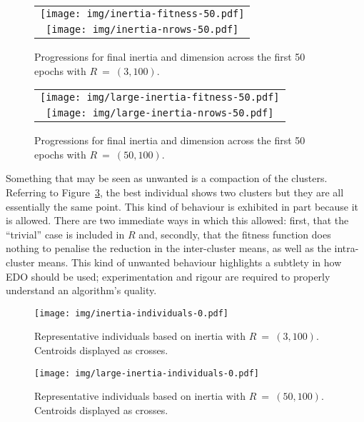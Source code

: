 \begin{figure}[htbp]
    \ContinuedFloat*
    \centering
    \begin{tabular}{c}
        \texttt{[image: img/inertia-fitness-50.pdf]}\\
        \texttt{[image: img/inertia-nrows-50.pdf]}
    \end{tabular}
    \caption{%
        \label{figure:inertia-50}
        Progressions for final inertia and dimension across the first 50
        epochs with \(R~=~(3,100)\).
    }
\end{figure}

\begin{figure}[htbp]
    \ContinuedFloat%
    \centering
    \begin{tabular}{c}
        \texttt{[image: img/large-inertia-fitness-50.pdf]}\\
        \texttt{[image: img/large-inertia-nrows-50.pdf]}
    \end{tabular}
    \caption{%
        \label{figure:large-inertia-50}
        Progressions for final inertia and dimension across the first 50 epochs
        with \(R~=~(50,100)\).
    }
\end{figure}

Something that may be seen as unwanted is a compaction of the clusters.
Referring to Figure~\ref{figure:inertia-individuals}, the best individual
shows
two clusters but they are all essentially the same point. This kind of behaviour
is exhibited in part because it is allowed. There are two immediate ways in
which this allowed: first, that the ``trivial'' case is included in \(R\) and,
secondly, that the fitness function does nothing to penalise the reduction in
the inter-cluster means, as well as the intra-cluster means. This kind of
unwanted behaviour highlights a subtlety in how EDO should be used;
experimentation and rigour are required to properly understand an algorithm's
quality.

\begin{figure}[htbp]
    \ContinuedFloat*
    \centering
    \texttt{[image: img/inertia-individuals-0.pdf]}
    \caption{%
        \label{figure:inertia-individuals}
        Representative individuals based on inertia with \(R~=~(3,100)\).
        Centroids displayed as crosses.
    }
\end{figure}

\begin{figure}[htbp]
    \ContinuedFloat%
    \centering
    \texttt{[image: img/large-inertia-individuals-0.pdf]}
    \caption{%
        \label{figure:large-inertia-individuals}
        Representative individuals based on inertia with \(R~=~(50,100)\).
        Centroids displayed as crosses.
    }
\end{figure}

